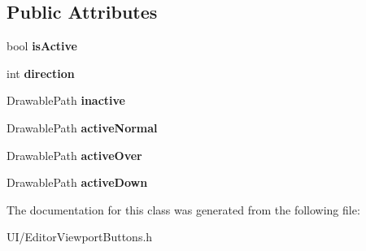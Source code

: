 \subsection*{Public Attributes}
\begin{DoxyCompactItemize}
\item 
\hypertarget{classSignalChainScrollButton_a5f9a528838cea1709e984c5937d11e1d}{bool {\bfseries is\-Active}}\label{classSignalChainScrollButton_a5f9a528838cea1709e984c5937d11e1d}

\item 
\hypertarget{classSignalChainScrollButton_a85745c7a19685327478de02182277c4c}{int {\bfseries direction}}\label{classSignalChainScrollButton_a85745c7a19685327478de02182277c4c}

\item 
\hypertarget{classSignalChainScrollButton_ad58deaed9ccbd226a3f267ec9b65fc35}{Drawable\-Path {\bfseries inactive}}\label{classSignalChainScrollButton_ad58deaed9ccbd226a3f267ec9b65fc35}

\item 
\hypertarget{classSignalChainScrollButton_a29548e0209d31b560c5d2d1b175f81fe}{Drawable\-Path {\bfseries active\-Normal}}\label{classSignalChainScrollButton_a29548e0209d31b560c5d2d1b175f81fe}

\item 
\hypertarget{classSignalChainScrollButton_a56bc06f2905a748dbe3318ba02e95148}{Drawable\-Path {\bfseries active\-Over}}\label{classSignalChainScrollButton_a56bc06f2905a748dbe3318ba02e95148}

\item 
\hypertarget{classSignalChainScrollButton_a6f33a146e8e19e8accf5ede376eb7010}{Drawable\-Path {\bfseries active\-Down}}\label{classSignalChainScrollButton_a6f33a146e8e19e8accf5ede376eb7010}

\end{DoxyCompactItemize}


The documentation for this class was generated from the following file\-:\begin{DoxyCompactItemize}
\item 
U\-I/Editor\-Viewport\-Buttons.\-h\end{DoxyCompactItemize}
